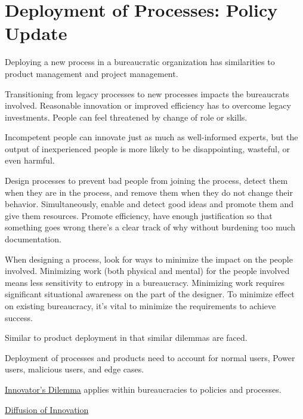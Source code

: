 \section{Deployment of Processes: Policy Update}

Deploying a new process in a bureaucratic organization has similarities to product management and project management. 

Transitioning from legacy processes to new processes impacts the bureaucrats involved. Reasonable innovation or improved efficiency has to overcome legacy investments. People can feel threatened by change of role or skills.  

Incompetent people can innovate just as much as well-informed experts, but the output of inexperienced people is more likely to be disappointing, wasteful, or even harmful. 

Design processes to prevent bad people from joining the process, detect them when they are in the process, and remove them when they do not change their behavior. Simultaneously, enable and detect good ideas and promote them and give them resources.
Promote efficiency, have enough justification so that something goes wrong there's a clear track of why without burdening too much documentation.


When designing a process, look for ways to minimize the impact on the people involved. Minimizing work (both physical and mental) for the people involved means less sensitivity to entropy in a bureaucracy. Minimizing work requires significant situational awareness on the part of the designer. To minimize effect on existing bureaucracy, it's vital to minimize the requirements to achieve success.


Similar to product deployment in that similar dilemmas are faced.

Deployment of processes and products need to account for 
normal users, Power users, malicious users, and edge cases.

\href{https://en.m.wikipedia.org/wiki/The_Innovator's_Dilemma}{Innovator's Dilemma} applies within bureaucracies to policies and processes.

\href{https://en.wikipedia.org/wiki/Diffusion_of_innovations}{Diffusion of Innovation}




